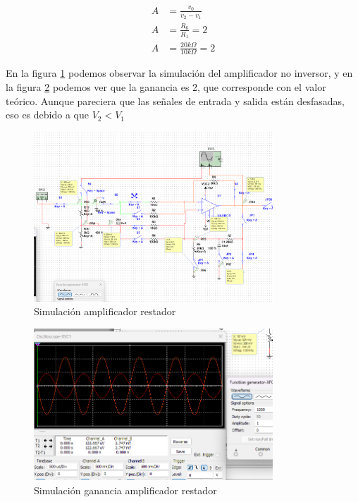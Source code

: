 \begin{align*}
    A &= \frac{v_0}{v_2 - v_1} \\
    A & = \frac{R_6}{R_1} = 2 \\
    A &= \frac{20k\Omega}{10k\Omega} = 2
\end{align*}

En la figura \ref{fig:sim-amp-restador} podemos observar la simulación del amplificador no inversor, y en la figura \ref{fig:sim-amp-restador-ganancia} podemos ver que la ganancia es 2, que corresponde con el valor teórico. Aunque pareciera que las señales de entrada y salida están desfasadas, eso es debido a que $V_2 < V_1$

\begin{figure}[ht]
    \centering
    \includegraphics[width=0.8\textwidth]{src/images/simulaciones/amp-restador.png}
    \caption{Simulación amplificador restador}
    \label{fig:sim-amp-restador}
\end{figure}

\begin{figure}[ht]
    \centering
    \includegraphics[width=0.8\textwidth]{src/images/simulaciones/amp-restador-ganancia.png}
    \caption{Simulación ganancia amplificador restador}
    \label{fig:sim-amp-restador-ganancia}
\end{figure}


